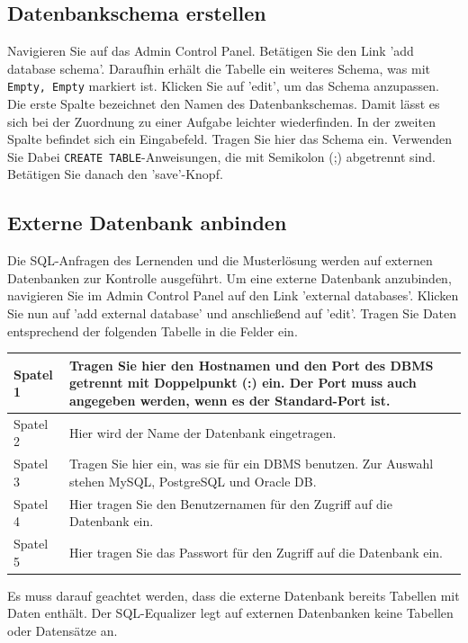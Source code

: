 \documentclass[12pt]{scrreprt}
\theoremstyle{remark}
\begin{document}
\subsection{Datenbankschema erstellen}

Navigieren Sie auf das Admin Control Panel. Betätigen Sie den Link 'add database schema'. Daraufhin erhält die Tabelle ein weiteres Schema, was mit \verb|Empty, Empty| markiert ist. Klicken Sie auf 'edit', um das Schema anzupassen. Die erste Spalte bezeichnet den Namen des Datenbankschemas. Damit lässt es sich bei der Zuordnung zu einer Aufgabe leichter wiederfinden. In der zweiten Spalte befindet sich ein Eingabefeld. Tragen Sie hier das Schema ein. Verwenden Sie Dabei \verb|CREATE TABLE|-Anweisungen, die mit Semikolon (;) abgetrennt sind. Betätigen Sie danach den 'save'-Knopf.

\subsection{Externe Datenbank anbinden}

Die SQL-Anfragen des Lernenden und die Musterlösung werden auf externen Datenbanken zur Kontrolle ausgeführt. Um eine externe Datenbank anzubinden, navigieren Sie im Admin Control Panel auf den Link 'external databases'. Klicken Sie nun auf 'add external database' und anschließend auf 'edit'.  Tragen Sie Daten entsprechend der folgenden Tabelle in die Felder ein.

\begin{tabular}{|l|p{14cm}|}\hline
Spatel 1 & Tragen Sie hier den Hostnamen und den Port des DBMS getrennt mit Doppelpunkt (:) ein. Der Port muss auch angegeben werden, wenn es der Standard-Port ist.\\\hline
Spatel 2 & Hier wird der Name der Datenbank eingetragen.\\\hline
Spatel 3 & Tragen Sie hier ein, was sie für ein DBMS benutzen. Zur Auswahl stehen MySQL, PostgreSQL und Oracle DB.\\\hline
Spatel 4 & Hier tragen Sie den Benutzernamen für den Zugriff auf die Datenbank ein.\\\hline
Spatel 5 & Hier tragen Sie das Passwort für den Zugriff auf die Datenbank ein.\\\hline
\end{tabular}



Es muss darauf geachtet werden, dass die externe Datenbank bereits Tabellen mit Daten enthält. Der SQL-Equalizer legt auf externen Datenbanken keine Tabellen oder Datensätze an.
\end{document}
